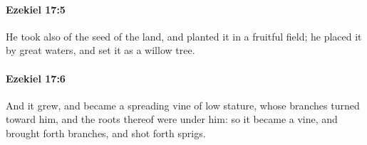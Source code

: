 		\paragraph{Ezekiel 17:5} %
			\label{EZEKIEL-17-5}

			He took also of the seed of the land, and planted it in a fruitful field; he placed it by great waters, and set it as a willow tree.


		\paragraph{Ezekiel 17:6} %
			\label{EZEKIEL-17-6}

			And it grew, and became a spreading vine of low stature, whose branches turned toward him, and the roots thereof were under him: so it became a vine, and brought forth branches, and shot forth sprigs.


